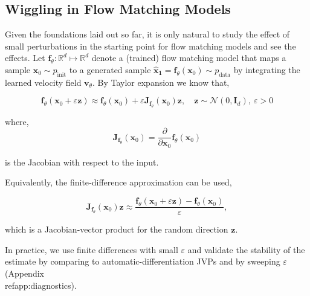\subsection{Wiggling in Flow Matching Models}
\label{subsec:Wiggle in models}

Given the foundations laid out so far, it is only natural to study the effect of small perturbations in the starting point for flow matching models and see the effects. Let $\mathbf{f}_\theta: \mathbb{R}^d \mapsto \mathbb{R}^d$ denote a (trained) flow matching model that maps a sample $\mathbf{x}_0 \sim p_{\text{init}}$ to a generated sample $\mathbf{\hat{x}_1} = \mathbf{f}_\theta(\mathbf{x}_0) \sim p_{\text{data}}$ by integrating the learned velocity field $\mathbf{v}_\theta$. By Taylor expansion we know that,

$$
\mathbf{f}_{\theta}(\mathbf{x}_0 + \varepsilon \mathbf{z}) \approx \mathbf{f}_{\theta}(\mathbf{x}_0) + \varepsilon \mathbf{J}_{\mathbf{f}_{\theta}}(\mathbf{x}_0) \mathbf{z}, \quad \mathbf{z} \sim \mathcal{N}(0, \mathbf{I}_d), \ \varepsilon > 0
$$

where,
$$
\mathbf{J}_{\mathbf{f}_{\theta}}(\mathbf{x}_0) = \frac{\partial}{\partial \mathbf {x}_0} \mathbf{f}_{\theta}(\mathbf{x}_0)
$$

is the Jacobian with respect to the input. 

Equivalently, the finite‐difference approximation can be used,

\begin{equation}
    \label{eq:jacobian_approx}
    \mathbf{J}_{\mathbf{f}_{\theta}}(\mathbf{x}_0) \mathbf{z} \approx \frac{\mathbf{f}_{\theta}(\mathbf{x}_0 + \varepsilon \mathbf{z}) - \mathbf{f}_{\theta}(\mathbf{x}_0)}{\varepsilon},
\end{equation}

which is a Jacobian-vector product for the random direction $\mathbf{z}$.

In practice, we use finite differences with small $\varepsilon$ and validate the stability of the estimate by comparing to automatic-differentiation JVPs and by sweeping $\varepsilon$ (Appendix~\\ref{app:diagnostics}).
